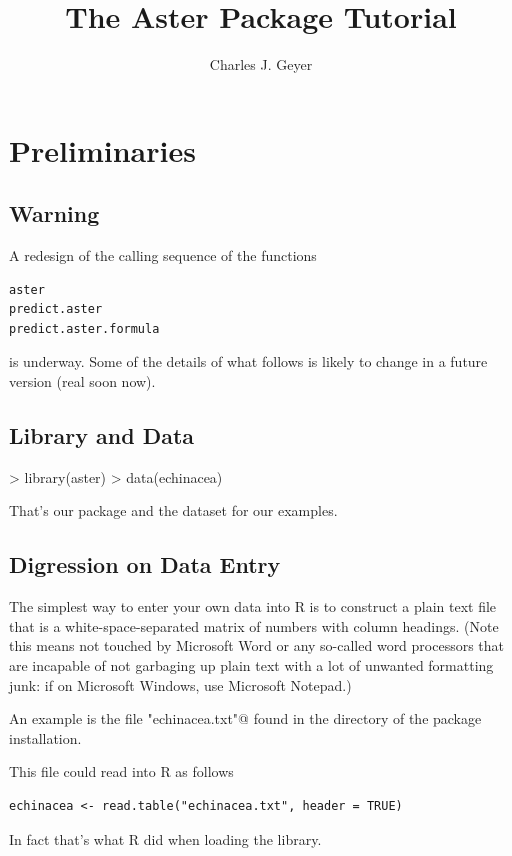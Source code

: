 \documentclass[11pt]{article}
\begin{document}
\title{The Aster Package Tutorial}
\author{Charles J. Geyer}
\maketitle


\section{Preliminaries}

\subsection{Warning} \label{sec:warn}

A redesign of the calling sequence of the functions
\begin{verbatim}
aster
predict.aster
predict.aster.formula
\end{verbatim}
is underway.  Some of the details of what follows is likely
to change in a future version (real soon now).

\subsection{Library and Data}

\begin{Schunk}
\begin{Sinput}
> library(aster)
> data(echinacea)
\end{Sinput}
\end{Schunk}
That's our package and the dataset for our examples.

\subsection{Digression on Data Entry}

The simplest way to enter your own data into R is to construct a plain
text file that is a white-space-separated matrix of
numbers with column headings.
(Note this means not touched by Microsoft Word or any so-called
word processors that are incapable of not garbaging up plain text
with a lot of unwanted formatting junk: if on Microsoft Windows,
use Microsoft Notepad.)

An example is the file
\verb@"echinacea.txt"@ found in the \verb@data@ directory of the
package installation.

This file could read into R as follows
\begin{verbatim}
echinacea <- read.table("echinacea.txt", header = TRUE)
\end{verbatim}
In fact that's what R did when loading the library.
\end{document}
